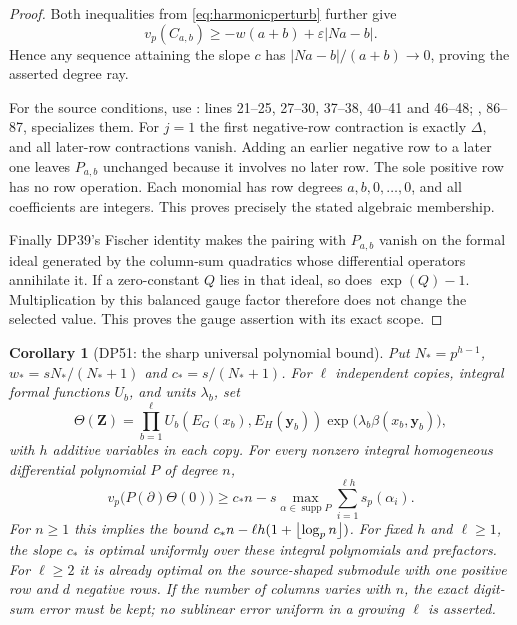 \documentclass[11pt,a4paper]{article}
\newtheorem{corollary}[theorem]{Corollary}
\theoremstyle{definition}\newtheorem{remark}[theorem]{Remark}
\newcommand{\vp}{v_p}\newcommand{\dR}{\mathrm{dR}}\newcommand{\crys}{\mathrm{crys}}
\begin{document}
\begin{proof}
Both inequalities from \eqref{eq:harmonicperturb} further give
\[
 \vp(C_{a,b})\ge-w(a+b)+\varepsilon|Na-b|.
\]
Hence any sequence attaining the slope $c$ has
$|Na-b|/(a+b)\to0$, proving the asserted degree ray.

For the source conditions, use :  lines 21--25,
 27--30,  37--38,  40--41 and
 46--48; ,  86--87, specializes them.
For $j=1$ the first negative-row contraction is exactly $\Delta$, and all later-row contractions vanish.
Adding an earlier negative row to a later one leaves $P_{a,b}$ unchanged because it involves no later row.
The sole positive row has no row operation.
Each monomial has row degrees $a,b,0,\ldots,0$, and all coefficients are integers.
This proves precisely the stated algebraic  membership.

Finally DP39's Fischer identity makes the pairing with $P_{a,b}$ vanish on the formal ideal generated by the column-sum quadratics whose differential operators annihilate it.
If a zero-constant $Q$ lies in that ideal, so does $\exp(Q)-1$.
Multiplication by this balanced gauge factor therefore does not change the selected value.
This proves the gauge assertion with its exact scope.
\end{proof}

\begin{corollary}[DP51: the sharp universal polynomial bound]
Put $N_*=p^{h-1}$, $w_*=sN_* /(N_*+1)$ and $c_*=s/(N_*+1)$.
For $\ell$ independent copies, integral formal functions $U_b$, and units $\lambda_b$, set
\[
 \Theta(\mathbf Z)=\prod_{b=1}^{\ell}
 U_b(E_G(x_b),E_H(\mathbf y_b))
 \exp\bigl(\lambda_b\beta(x_b,\mathbf y_b)\bigr),
\]
with $h$ additive variables in each copy.
For every nonzero integral homogeneous differential polynomial $P$ of degree $n$,
\begin{equation}\label{eq:harmonicuniversal}
 \vp\bigl(P(\partial)\Theta(0)\bigr)
 \ge c_*n-s\max_{\alpha\in\operatorname{supp}P}
                  \sum_{i=1}^{\ell h}s_p(\alpha_i).
\end{equation}
For $n\ge1$ this implies the bound
$c_*n-\ell h(1+\left\lfloor \log_p n\right\rfloor)$.
For fixed $h$ and $\ell\ge1$, the slope $c_*$ is optimal uniformly over these integral polynomials and prefactors.
For $\ell\ge2$ it is already optimal on the source-shaped  submodule with one positive row and $d$ negative rows.
If the number of columns varies with $n$, the exact digit-sum error must be kept; no sublinear error uniform in a growing $\ell$ is asserted.
\end{corollary}
\end{document}
